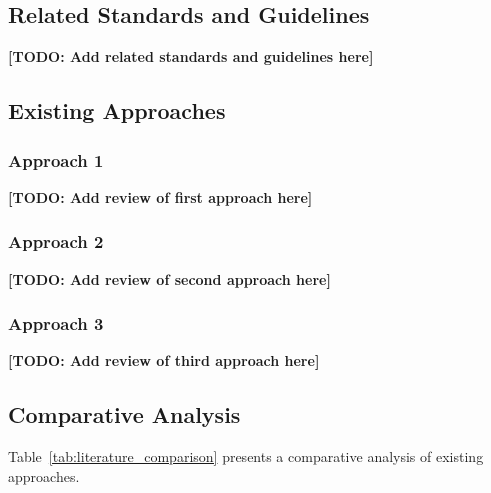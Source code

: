 
\subsection{Related Standards and Guidelines}


\textbf{[TODO: Add related standards and guidelines here]}

\subsection{Existing Approaches}


\subsubsection{Approach 1}
\textbf{[TODO: Add review of first approach here]} \cite{ref1}

\subsubsection{Approach 2}
\textbf{[TODO: Add review of second approach here]} \cite{ref2}

\subsubsection{Approach 3}
\textbf{[TODO: Add review of third approach here]} \cite{ref3}

\subsection{Comparative Analysis}


Table~\ref{tab:literature_comparison} presents a comparative analysis of existing approaches.

